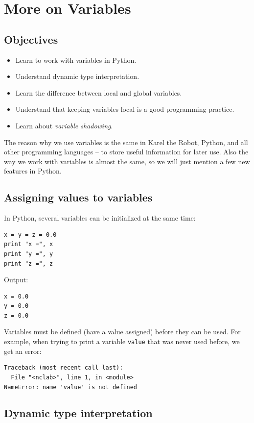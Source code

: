 \section{More on Variables}

\subsection{Objectives}

\begin{itemize}
\item Learn to work with variables in Python.
\item Understand dynamic type interpretation.
\item Learn the difference between local and global variables.
\item Understand that keeping variables local is a good programming practice.
\item Learn about {\em variable shadowing}.
\end{itemize}
The reason why we use variables is the same in Karel the Robot, Python, and all other programming 
languages -- to store useful information for later use. Also the way we work with variables is almost the 
same, so we will just mention a few new features in Python.

\subsection{Assigning values to variables}

In Python, several variables can be initialized at the same time:

\begin{verbatim}
x = y = z = 0.0
print "x =", x
print "y =", y
print "z =", z
\end{verbatim}
Output:

\begin{verbatim}
x = 0.0
y = 0.0
z = 0.0
\end{verbatim}
Variables must be defined (have a value assigned) before they can be 
used. For example, when trying to print a variable {\tt value} that 
was never used before, we get an error:

\begin{verbatim}
Traceback (most recent call last):
  File "<nclab>", line 1, in <module>
NameError: name 'value' is not defined
\end{verbatim}

\subsection{Dynamic type interpretation}

